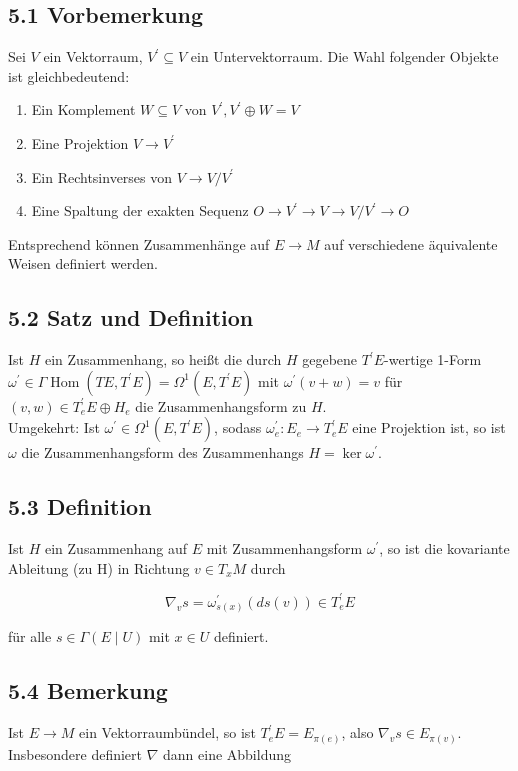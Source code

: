 \subsection*{5.1 Vorbemerkung}
Sei $V$ ein Vektorraum, $V^{\prime} \subseteq V$ ein Untervektorraum. Die Wahl folgender Objekte ist gleichbedeutend:

\begin{enumerate}
  \item Ein Komplement $W \subseteq V$ von $V^{\prime}, V^{\prime} \oplus W=V$
  \item Eine Projektion $V \rightarrow V^{\prime}$
  \item Ein Rechtsinverses von $V \rightarrow V / V^{\prime}$
  \item Eine Spaltung der exakten Sequenz $O \rightarrow V^{\prime} \rightarrow V \rightarrow V / V^{\prime} \rightarrow O$
\end{enumerate}

Entsprechend können Zusammenhänge auf $E \rightarrow M$ auf verschiedene äquivalente Weisen definiert werden.

\subsection*{5.2 Satz und Definition}
Ist $H$ ein Zusammenhang, so heißt die durch $H$ gegebene $T^{\prime} E$-wertige 1-Form $\omega^{\prime} \in \Gamma \operatorname{Hom}\left(T E, T^{\prime} E\right)=\Omega^{1}\left(E, T^{\prime} E\right)$ mit $\omega^{\prime}(v+w)=v$ für $(v, w) \in T_{e}^{\prime} E \oplus H_{e}$ die Zusammenhangsform zu $H$.\\
Umgekehrt: Ist $\omega^{\prime} \in \Omega^{1}\left(E, T^{\prime} E\right)$, sodass $\omega_{e}^{\prime}: E_{e} \rightarrow T_{e}^{\prime} E$ eine Projektion ist, so ist $\omega$ die Zusammenhangsform des Zusammenhangs $H=\operatorname{ker} \omega^{\prime}$.

\subsection*{5.3 Definition}
Ist $H$ ein Zusammenhang auf $E$ mit Zusammenhangsform $\omega^{\prime}$, so ist die kovariante Ableitung (zu H) in Richtung $v \in T_{x} M$ durch

$$
\nabla_{v} s=\omega_{s(x)}^{\prime}(d s(v)) \in T_{e}^{\prime} E
$$

für alle $s \in \Gamma(E \mid U)$ mit $x \in U$ definiert.

\subsection*{5.4 Bemerkung}
Ist $E \rightarrow M$ ein Vektorraumbündel, so ist $T_{e}^{\prime} E=E_{\pi(e)}$, also $\nabla_{v} s \in E_{\pi(v)}$. Insbesondere definiert $\nabla$ dann eine Abbildung

